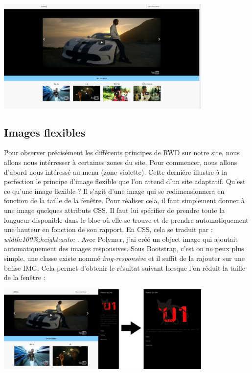 \documentclass{article}
\begin{document}
\begin{center}
  \includegraphics[width=0.8\textwidth]{p1}
\end{center}

\subsection{Images flexibles}

Pour observer pr\'ecis\'ement les diff\'erents principes de RWD sur notre site, nous allons nous int\'erresser \`a certaines zones du site. Pour commencer, nous allons d'abord nous int\'eress\'e au menu (zone violette). Cette derni\'ere illustre \`a la perfection le principe d'image flexible que l'on attend d'un site adaptatif. Qu'est ce qu'une image flexible ? Il s'agit d'une image qui se redimensionnera en fonction de la taille de la fen\^etre. Pour r\'ealiser cela, il faut simplement donner \`a une image quelques attributs CSS. Il faut lui sp\'ecifier de prendre toute la longueur disponible dans le bloc o\`u elle se trouve et de prendre automatiquement une hauteur en fonction de son rapport. En CSS, cela se traduit par : \textit{\og width:100\%;height:auto; \fg{} }. Avec Polymer, j'ai cr\'e\'e un object image qui ajoutait automatiquement des images responsives. Sous Bootstrap, c'est on ne peux plus simple, une classe existe nomm\'e \textit{\og img-responsive \fg} et il suffit de la rajouter sur une balise IMG. Cela permet d'obtenir le r\'esultat suivant lorsque l'on r\'eduit la taille de la fen\^etre :\\

\begin{center}
  \includegraphics[width=0.8\textwidth]{p4}
\end{center}
\end{document}
